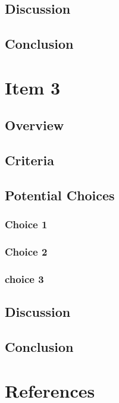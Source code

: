 \documentclass[letterpaper,10pt]{article}
\begin{document}
	\subsection{Discussion}
	
	\subsection{Conclusion}
	
	
\section{Item 3}
		\subsection{Overview}
	
	\subsection{Criteria}
	
	\subsection{Potential Choices}
		\subsubsection{Choice 1}
		
		\subsubsection{Choice 2}
		
		\subsubsection{choice 3}
		
	\subsection{Discussion}
	
	\subsection{Conclusion}
	
\section{References}
\end{document}
